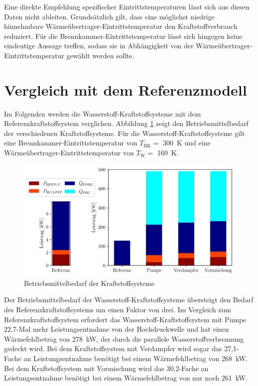 Eine direkte Empfehlung spezifischer Eintrittstemperaturen lässt sich aus diesen Daten nicht ableiten. Grundsätzlich gilt, dass eine möglichst niedrige hinnehmbare Wärmeübertrager-Eintrittstemperatur den Kraftstoffverbrauch reduziert. Für die Brennkammer-Eintrittstemperatur lässt sich hingegen keine eindeutige Aussage treffen, sodass sie in Abhängigkeit von der Wärmeübertrager-Eintrittstemperatur gewählt werden sollte.

\section{Vergleich mit dem Referenzmodell}

Im Folgenden werden die Wasserstoff-Kraftstoffsysteme mit dem Referenzkraftstoffsystem verglichen. Abbildung \ref{fig:refcomp} zeigt den Betriebsmittelbedarf der verschiedenen Kraftstoffsysteme. Für die Wasserstoff-Kraftstoffsysteme gilt eine Brennkammer-Eintrittstemperatur von $T_\mathrm{BK}=$ \SI{300}{\K} und eine Wärmeübertrager-Eintrittstemperatur von $T_\mathrm{W}=$ \SI{160}{\K}.

\begin{figure}[ht]
\centering
\includegraphics[width=1\linewidth]{4_Abbildungen/2_Hauptteil/Ergebnisse/refcomp.pdf}
  \caption{Betriebsmittelbedarf der Kraftstoffsysteme}
  \label{fig:refcomp}
\end{figure}
\FloatBarrier

Der Betriebsmittelbedarf der Wasserstoff-Kraftstoffsysteme übersteigt den Bedarf des Referenzkraftstoffsystems um einen Faktor von drei. Im Vergleich zum Referenzkraftstoffsystem erfordert das Wasserstoff-Kraftstoffsystem mit Pumpe 22,7-Mal mehr Leistungsentnahme von der Hochdruckwelle und hat einen Wärmefehlbetrag von \SI{278}{\kilo\W}, der durch die parallele Wasserstoffverbrennung gedeckt wird. Bei dem Kraftstoffsystem mit Verdampfer wird sogar das 27,1-Fache an Leistungsentnahme benötigt bei einem Wärmefehlbetrag von \SI{268}{\kilo\W}. Bei dem Kraftstoffsystem mit Vormischung wird das 30,2-Fache an Leistungsentnahme benötigt bei einem Wärmefehlbetrag von nur noch \SI{261}{\kilo\W}. 

